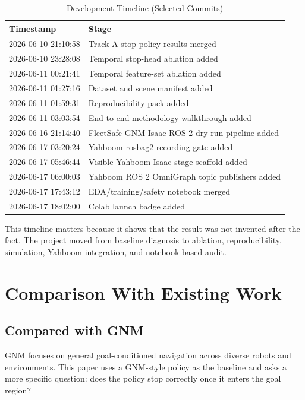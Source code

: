 \documentclass[conference]{IEEEtran}
\begin{document}
\begin{table}[h]
\centering
\caption{Development Timeline (Selected Commits)}
\begin{tabular}{ll}
\toprule
\textbf{Timestamp} & \textbf{Stage} \\
\midrule
2026-06-10 21:10:58 & Track A stop-policy results merged \\
2026-06-10 23:28:08 & Temporal stop-head ablation added \\
2026-06-11 00:21:41 & Temporal feature-set ablation added \\
2026-06-11 01:27:16 & Dataset and scene manifest added \\
2026-06-11 01:59:31 & Reproducibility pack added \\
2026-06-11 03:03:54 & End-to-end methodology walkthrough added \\
2026-06-16 21:14:40 & FleetSafe-GNM Isaac ROS 2 dry-run pipeline added \\
2026-06-17 03:20:24 & Yahboom rosbag2 recording gate added \\
2026-06-17 05:46:44 & Visible Yahboom Isaac stage scaffold added \\
2026-06-17 06:00:03 & Yahboom ROS 2 OmniGraph topic publishers added \\
2026-06-17 17:43:12 & EDA/training/safety notebook merged \\
2026-06-17 18:02:00 & Colab launch badge added \\
\bottomrule
\end{tabular}
\end{table}

This timeline matters because it shows that the result was not invented after the fact. The project moved from baseline diagnosis to ablation, reproducibility, simulation, Yahboom integration, and notebook-based audit.

\section{Comparison With Existing Work}

\subsection{Compared with GNM}
GNM focuses on general goal-conditioned navigation across diverse robots and environments. This paper uses a GNM-style policy as the baseline and asks a more specific question: does the policy stop correctly once it enters the goal region?
\end{document}
